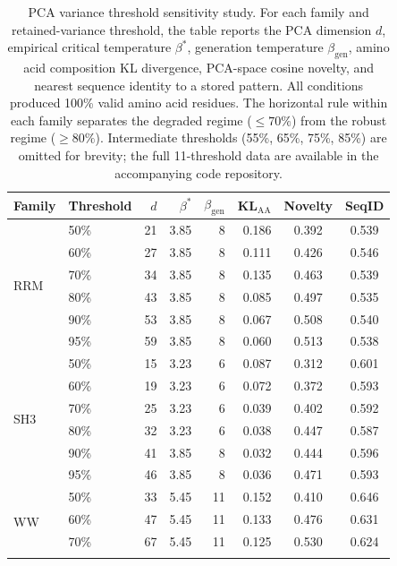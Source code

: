 \begin{table}[p]
\centering
\caption{PCA variance threshold sensitivity study. For each family and retained-variance threshold, the table reports the PCA dimension $d$, empirical critical temperature $\beta^*$, generation temperature $\beta_{\mathrm{gen}}$, amino acid composition KL divergence, PCA-space cosine novelty, and nearest sequence identity to a stored pattern. All conditions produced 100\% valid amino acid residues. The horizontal rule within each family separates the degraded regime ($\leq 70\%$) from the robust regime ($\geq 80\%$). Intermediate thresholds (55\%, 65\%, 75\%, 85\%) are omitted for brevity; the full 11-threshold data are available in the accompanying code repository.}
\label{tab:pca-sensitivity}
\scriptsize
\setlength{\tabcolsep}{4pt}
\renewcommand{\arraystretch}{0.85}
\begin{tabular}{@{}llrrrrcc@{}}
\toprule
Family & Threshold & $d$ & $\beta^*$ & $\beta_{\mathrm{gen}}$ & KL$_{\mathrm{AA}}$ & Novelty & SeqID \\
\midrule
\multirow{6}{*}{RRM}
 & 50\% &  21 & 3.85 &  8 & 0.186 & 0.392 & 0.539 \\
 & 60\% &  27 & 3.85 &  8 & 0.111 & 0.426 & 0.546 \\
 & 70\% &  34 & 3.85 &  8 & 0.135 & 0.463 & 0.539 \\
\cmidrule{2-8}
 & 80\% &  43 & 3.85 &  8 & 0.085 & 0.497 & 0.535 \\
 & 90\% &  53 & 3.85 &  8 & 0.067 & 0.508 & 0.540 \\
 & 95\% &  59 & 3.85 &  8 & 0.060 & 0.513 & 0.538 \\
\midrule
\multirow{6}{*}{SH3}
 & 50\% &  15 & 3.23 &  6 & 0.087 & 0.312 & 0.601 \\
 & 60\% &  19 & 3.23 &  6 & 0.072 & 0.372 & 0.593 \\
 & 70\% &  25 & 3.23 &  6 & 0.039 & 0.402 & 0.592 \\
\cmidrule{2-8}
 & 80\% &  32 & 3.23 &  6 & 0.038 & 0.447 & 0.587 \\
 & 90\% &  41 & 3.85 &  8 & 0.032 & 0.444 & 0.596 \\
 & 95\% &  46 & 3.85 &  8 & 0.036 & 0.471 & 0.593 \\
\midrule
\multirow{6}{*}{WW}
 & 50\% &  33 & 5.45 & 11 & 0.152 & 0.410 & 0.646 \\
 & 60\% &  47 & 5.45 & 11 & 0.133 & 0.476 & 0.631 \\
 & 70\% &  67 & 5.45 & 11 & 0.125 & 0.530 & 0.624 \\
\cmidrule{2-8}

\end{tabular}
\end{table}
